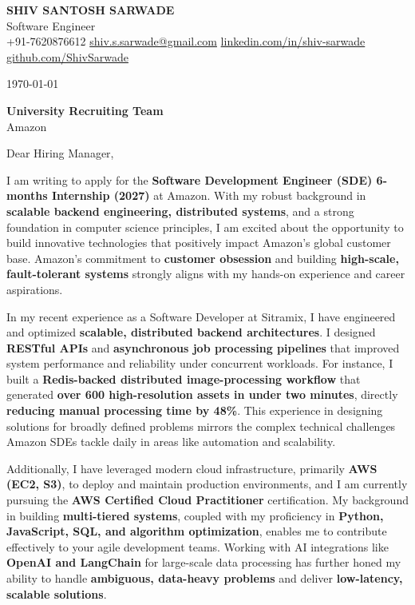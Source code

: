 \documentclass[a4paper,10pt]{article}
\begin{document}
\pagestyle{empty}

\begin{center}
    {\LARGE \textbf{SHIV SANTOSH SARWADE}}\\
    Software Engineer\\[4pt]
    +91-7620876612 \quad
    \href{mailto:shiv.s.sarwade@gmail.com}{shiv.s.sarwade@gmail.com} \quad
    \href{https://linkedin.com/in/shiv-sarwade}{linkedin.com/in/shiv-sarwade} \quad
    \href{https://github.com/ShivSarwade}{github.com/ShivSarwade}
\end{center}

\vspace{2em}

\today

\textbf{University Recruiting Team}\\
Amazon\\
\vspace{1em}

Dear Hiring Manager,

I am writing to apply for the \textbf{Software Development Engineer (SDE) 6-months Internship (2027)} at Amazon. With my robust background in \textbf{scalable backend engineering, distributed systems}, and a strong foundation in computer science principles, I am excited about the opportunity to build innovative technologies that positively impact Amazon's global customer base. Amazon's commitment to \textbf{customer obsession} and building \textbf{high-scale, fault-tolerant systems} strongly aligns with my hands-on experience and career aspirations.

In my recent experience as a Software Developer at Sitramix, I have engineered and optimized \textbf{scalable, distributed backend architectures}. I designed \textbf{RESTful APIs} and \textbf{asynchronous job processing pipelines} that improved system performance and reliability under concurrent workloads. For instance, I built a \textbf{Redis-backed distributed image-processing workflow} that generated \textbf{over 600 high-resolution assets in under two minutes}, directly \textbf{reducing manual processing time by 48\%}. This experience in designing solutions for broadly defined problems mirrors the complex technical challenges Amazon SDEs tackle daily in areas like automation and scalability.

Additionally, I have leveraged modern cloud infrastructure, primarily \textbf{AWS (EC2, S3)}, to deploy and maintain production environments, and I am currently pursuing the \textbf{AWS Certified Cloud Practitioner} certification. My background in building \textbf{multi-tiered systems}, coupled with my proficiency in \textbf{Python, JavaScript, SQL, and algorithm optimization}, enables me to contribute effectively to your agile development teams. Working with AI integrations like \textbf{OpenAI and LangChain} for large-scale data processing has further honed my ability to handle \textbf{ambiguous, data-heavy problems} and deliver \textbf{low-latency, scalable solutions}.
\end{document}
